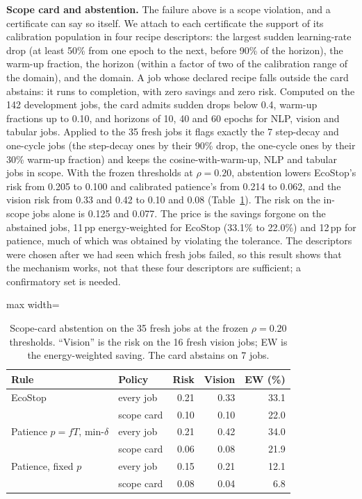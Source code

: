 \documentclass[3p,twocolumn,10pt]{elsarticle}
\theoremstyle{definition}
\begin{document}
\textbf{Scope card and abstention.} The failure above is a scope violation, and a certificate can say so itself. We attach to each certificate the support of its calibration population in four recipe descriptors: the largest sudden learning-rate drop (at least 50\% from one epoch to the next, before 90\% of the horizon), the warm-up fraction, the horizon (within a factor of two of the calibration range of the domain), and the domain. A job whose declared recipe falls outside the card abstains: it runs to completion, with zero savings and zero risk. Computed on the 142 development jobs, the card admits sudden drops below 0.4, warm-up fractions up to 0.10, and horizons of 10, 40 and 60 epochs for NLP, vision and tabular jobs. Applied to the 35 fresh jobs it flags exactly the 7 step-decay and one-cycle jobs (the step-decay ones by their 90\% drop, the one-cycle ones by their 30\% warm-up fraction) and keeps the cosine-with-warm-up, NLP and tabular jobs in scope. With the frozen thresholds at $\rho=0.20$, abstention lowers EcoStop's risk from 0.205 to 0.100 and calibrated patience's from 0.214 to 0.062, and the vision risk from 0.33 and 0.42 to 0.10 and 0.08 (Table~\ref{tab:scope}). The risk on the in-scope jobs alone is 0.125 and 0.077. The price is the savings forgone on the abstained jobs, 11\,pp energy-weighted for EcoStop (33.1\% to 22.0\%) and 12\,pp for patience, much of which was obtained by violating the tolerance. The descriptors were chosen after we had seen which fresh jobs failed, so this result shows that the mechanism works, not that these four descriptors are sufficient; a confirmatory set is needed.

\begin{table}[t]
\centering
\caption{Scope-card abstention on the 35 fresh jobs at the frozen $\rho=0.20$ thresholds. ``Vision'' is the risk on the 16 fresh vision jobs; EW is the energy-weighted saving. The card abstains on 7 jobs.}
\label{tab:scope}
\footnotesize
\begin{adjustbox}{max width=\columnwidth}
\begin{tabular}{p{2.5cm}lrrr}
\toprule
Rule & Policy & Risk & Vision & EW (\%) \\
\midrule
EcoStop & every job & 0.21 & 0.33 & 33.1 \\
 & scope card & 0.10 & 0.10 & 22.0 \\
Patience $p{=}fT$, min-$\delta$ & every job & 0.21 & 0.42 & 34.0 \\
 & scope card & 0.06 & 0.08 & 21.9 \\
Patience, fixed $p$ & every job & 0.15 & 0.21 & 12.1 \\
 & scope card & 0.08 & 0.04 & 6.8 \\
\bottomrule
\end{tabular}
\end{adjustbox}
\end{table}
\end{document}
